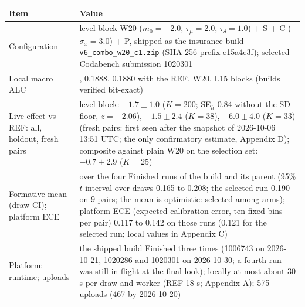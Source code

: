 \documentclass[
]{article}
\begin{document}
\begin{longtable}[]{@{}
  >{\raggedright\arraybackslash}p{}
  >{\raggedright\arraybackslash}p{}@{}}
\toprule\noalign{}
\begin{minipage}[b]{\linewidth}\raggedright
Item
\end{minipage} & \begin{minipage}[b]{\linewidth}\raggedright
Value
\end{minipage} \\
\midrule\noalign{}
\endhead
\bottomrule\noalign{}
\endlastfoot
Configuration & level block W20 (\(m_0 = -2.0\), \(\tau_\mu = 2.0\),
\(\tau_\delta = 1.0\)) + S + C (\(\sigma_x = 3.0\)) + P, shipped as the
insurance build \texttt{v6\_combo\_w20\_c1.zip} (SHA-256 prefix
e15a4e3f); selected Codabench submission 1020301 \\
Local macro ALC & 0.1910, 0.1888, 0.1880 with the REF, W20, L15 blocks
(builds verified bit-exact) \\
Live effect vs REF: all, holdout, fresh pairs & level block:
\(-1.7 \pm 1.0\) (\(K = 200\); SE\(_h\) 0.84 without the SD floor,
\(z = -2.06\)), \(-1.5 \pm 2.4\) (\(K = 38\)), \(-6.0 \pm 4.0\)
(\(K = 33\)) (fresh pairs: first seen after the snapshot of 2026-10-06
13:51 UTC; the only confirmatory estimate, Appendix D); composite
against plain W20 on the selection set: \(-0.7 \pm 2.9\) (\(K = 25\)) \\
Formative mean (draw CI); platform ECE & 0.186 over the four Finished
runs of the build and its parent (95\% \(t\) interval over draws 0.165
to 0.208; the selected run 0.190 on 9 pairs; the mean is optimistic:
selected among arms); platform ECE (expected calibration error, ten
fixed bins per pair) 0.117 to 0.142 on those runs (0.121 for the
selected run; local values in Appendix C) \\
Platform; runtime; uploads & the shipped build Finished three times
(1006743 on 2026-10-21, 1020286 and 1020301 on 2026-10-30; a fourth run
was still in flight at the final look); locally at most about 30 s per
draw and worker (REF 18 s; Appendix A); 575 uploads (467 by
2026-10-20) \\
\end{longtable}
\end{document}
